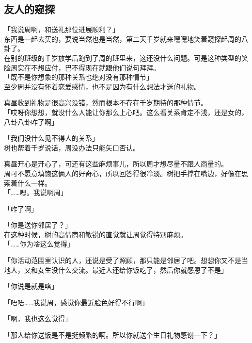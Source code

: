 \subsection{友人的窥探}

「我说周啊，和送礼那位进展顺利？」\\

东西是一起去买的，要说当然也是当然，第二天千岁就来嘿嘿地笑着窥探起周的八卦了。\\

在别的班级的千岁放学后跑到了周的班里来，这还没什么问题。可是这种类型的笑脸周实在不想应付，巴不得现在就跟他们说句拜拜。\\

「既不是你想象的那种关系也绝对没有那种情节」\\

至少周并没有怀着恋爱感情，也不是因为有什么想法才送的礼物。

真昼收到礼物是很高兴没错，然而根本不存在千岁期待的那种情节。\\

「哎呀你想想，就没什么人能让你那么上心吧。这么看关系肯定不浅，还是女的，八卦八卦咋了啊」

「我们没什么见不得人的关系」\\

树也帮着千岁说话，周没办法只能矢口否认。

真昼开心是开心了，可还有这些麻烦事儿，所以周才想尽量不跟人商量的。\\

周可不愿意填饱这俩人的好奇心，所以回答得很冷淡。树把手撑在嘴边，好像在思索着什么一样。\\

「……嗯。我说啊周」

「咋了啊」

「你是送你邻居了？」\\

在这种时候，树的高情商和敏锐的直觉就让周觉得特别麻烦。\\

「……你为啥这么觉得」

「你活动范围里认识的人，还说是受了照顾，那只能是邻居了吧。想想你又不是当地人，又和女生没什么交流。最近人还给你饭吃了，然后你就感恩了不是」

「你说是就是咯」

「唔唔……我说周，感觉你最近脸色好得不行啊」

「啊，我也这么觉得」

「那人给你送饭是不是挺频繁的啊。所以你就送个生日礼物感谢一下？」\\

